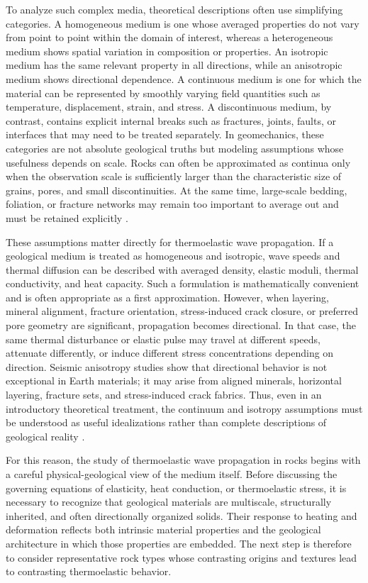 To analyze such complex media, theoretical descriptions often use simplifying categories. A homogeneous medium is one whose averaged properties do not vary from point to point within the domain of interest, whereas a heterogeneous medium shows spatial variation in composition or properties. An isotropic medium has the same relevant property in all directions, while an anisotropic medium shows directional dependence. A continuous medium is one for which the material can be represented by smoothly varying field quantities such as temperature, displacement, strain, and stress. A discontinuous medium, by contrast, contains explicit internal breaks such as fractures, joints, faults, or interfaces that may need to be treated separately. In geomechanics, these categories are not absolute geological truths but modeling assumptions whose usefulness depends on scale. Rocks can often be approximated as continua only when the observation scale is sufficiently larger than the characteristic size of grains, pores, and small discontinuities. At the same time, large-scale bedding, foliation, or fracture networks may remain too important to average out and must be retained explicitly \cite{cornet2007,jaeger2007}.

These assumptions matter directly for thermoelastic wave propagation. If a geological medium is treated as homogeneous and isotropic, wave speeds and thermal diffusion can be described with averaged density, elastic moduli, thermal conductivity, and heat capacity. Such a formulation is mathematically convenient and is often appropriate as a first approximation. However, when layering, mineral alignment, fracture orientation, stress-induced crack closure, or preferred pore geometry are significant, propagation becomes directional. In that case, the same thermal disturbance or elastic pulse may travel at different speeds, attenuate differently, or induce different stress concentrations depending on direction. Seismic anisotropy studies show that directional behavior is not exceptional in Earth materials; it may arise from aligned minerals, horizontal layering, fracture sets, and stress-induced crack fabrics. Thus, even in an introductory theoretical treatment, the continuum and isotropy assumptions must be understood as useful idealizations rather than complete descriptions of geological reality \cite{aki2002,crampin1981,thomsen1986,schultz2019}.

For this reason, the study of thermoelastic wave propagation in rocks begins with a careful physical-geological view of the medium itself. Before discussing the governing equations of elasticity, heat conduction, or thermoelastic stress, it is necessary to recognize that geological materials are multiscale, structurally inherited, and often directionally organized solids. Their response to heating and deformation reflects both intrinsic material properties and the geological architecture in which those properties are embedded. The next step is therefore to consider representative rock types whose contrasting origins and textures lead to contrasting thermoelastic behavior.